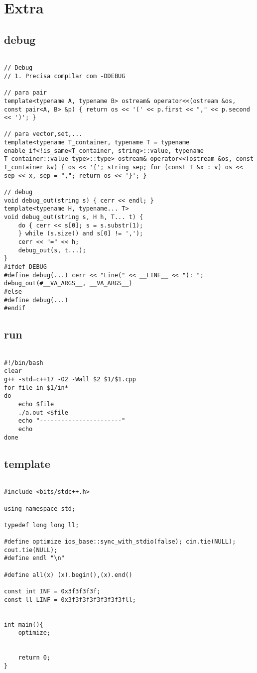 \documentclass[landscape,twocolumn,10pt,a4paper]{article}
\begin{document}
\section{Extra}
\subsection{debug}
\begin{verbatim}

// Debug
// 1. Precisa compilar com -DDEBUG

// para pair
template<typename A, typename B> ostream& operator<<(ostream &os, const pair<A, B> &p) { return os << '(' << p.first << "," << p.second << ')'; }

// para vector,set,...
template<typename T_container, typename T = typename enable_if<!is_same<T_container, string>::value, typename T_container::value_type>::type> ostream& operator<<(ostream &os, const T_container &v) { os << '{'; string sep; for (const T &x : v) os << sep << x, sep = ","; return os << '}'; }

// debug
void debug_out(string s) { cerr << endl; }
template<typename H, typename... T>
void debug_out(string s, H h, T... t) {
    do { cerr << s[0]; s = s.substr(1);
    } while (s.size() and s[0] != ',');
    cerr << "=" << h;
    debug_out(s, t...);
}
#ifdef DEBUG
#define debug(...) cerr << "Line(" << __LINE__ << "): "; debug_out(#__VA_ARGS__, __VA_ARGS__)
#else
#define debug(...)
#endif

\end{verbatim}

\subsection{run}
\begin{verbatim}

#!/bin/bash
clear
g++ -std=c++17 -O2 -Wall $2 $1/$1.cpp
for file in $1/in*
do
    echo $file
    ./a.out <$file
    echo "-----------------------"
    echo
done

\end{verbatim}

\subsection{template}
\begin{verbatim}

#include <bits/stdc++.h>

using namespace std;

typedef long long ll;

#define optimize ios_base::sync_with_stdio(false); cin.tie(NULL); cout.tie(NULL);
#define endl "\n"

#define all(x) (x).begin(),(x).end()

const int INF = 0x3f3f3f3f;
const ll LINF = 0x3f3f3f3f3f3f3f3fll;


int main(){
    optimize;


    return 0;
}

\end{verbatim}
\end{document}
